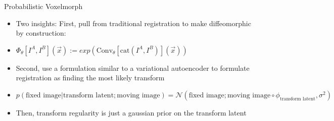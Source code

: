\documentclass{beamer}
\begin{document}
\begin{frame}{Probabilistic Voxelmorph}
        \begin{itemize}
              \item Two insights: First, pull from traditional registration to make diffeomorphic by construction:
	      \item $ \Phi_\theta[I^A, I^B](\vec{x}) := exp(\text{Conv}_\theta[\text{cat}(I^A, I^B)](\vec{x}))$
              \item Second, use a formulation similar to a variational autoencoder to formulate registration as finding the most likely transform

	      \item $  p(\text{fixed image} | \text{transform latent}; \text{moving image} ) = \mathcal{N}(\text{fixed image}; \text{moving image} \circ \phi_{\text{transform latent}}, \sigma^2)$

	      \item Then, transform regularity is just a gaussian prior on the transform latent

        \end{itemize}
\end{frame}
\end{document}
